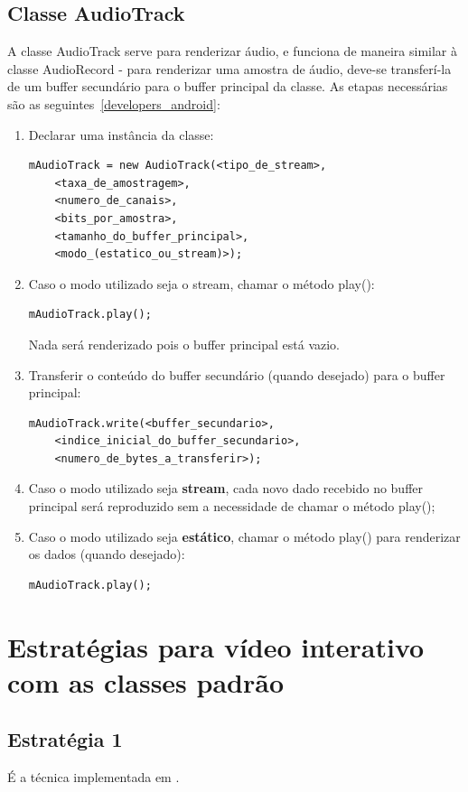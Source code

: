 \documentclass{acm_proc_article-sp}
\begin{document}
\subsection{Classe AudioTrack}
A classe AudioTrack serve para renderizar áudio, e funciona de maneira similar à classe AudioRecord - para renderizar uma amostra de áudio, deve-se transferí-la de um buffer secundário para o buffer principal da classe. As etapas necessárias são as seguintes~\ref{developers_android}:
\begin{enumerate}
 \item Declarar uma instância da classe:
  \begin{lstlisting}
mAudioTrack = new AudioTrack(<tipo_de_stream>,
    <taxa_de_amostragem>,
    <numero_de_canais>,
    <bits_por_amostra>,
    <tamanho_do_buffer_principal>,
    <modo_(estatico_ou_stream)>);
  \end{lstlisting}
 \item Caso o modo utilizado seja o stream, chamar o método play():
  \begin{lstlisting}
mAudioTrack.play();
  \end{lstlisting}
  Nada será renderizado pois o buffer principal está vazio.
 \item Transferir o conteúdo do buffer secundário (quando desejado) para o buffer principal:
  \begin{lstlisting}
mAudioTrack.write(<buffer_secundario>,
    <indice_inicial_do_buffer_secundario>,
    <numero_de_bytes_a_transferir>);
  \end{lstlisting}
 \item Caso o modo utilizado seja \textbf{stream}, cada novo dado recebido no buffer principal será reproduzido sem a necessidade de chamar o método play();
 \item Caso o modo utilizado seja \textbf{estático}, chamar o método play() para renderizar os dados (quando desejado):
  \begin{lstlisting}
mAudioTrack.play();
  \end{lstlisting}
\end{enumerate}

\section{Estratégias para vídeo interativo com as classes padrão}

\subsection{Estratégia 1}
É a técnica implementada em \cite{trab_alemao}.
\end{document}
